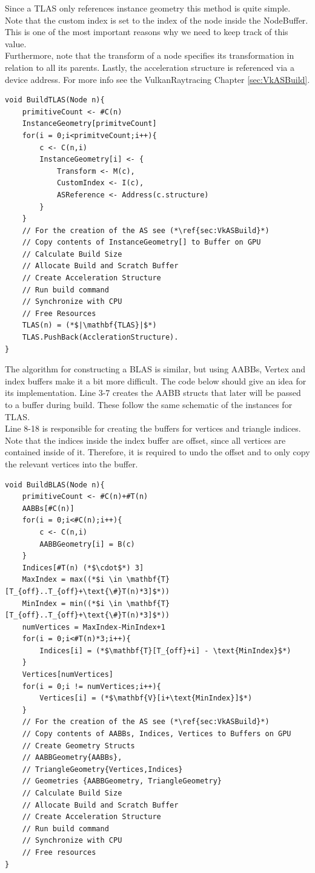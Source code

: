 Since a TLAS only references instance geometry this method is quite simple. Note that the custom index is set to the index of the node inside the NodeBuffer. This is one of the most important reasons why we need to keep track of this value.\\
Furthermore, note that the transform of a node specifies its transformation in relation to all its parents. Lastly, the acceleration structure is referenced via a device address. For more info see the VulkanRaytracing Chapter \ref{sec:VkASBuild}.
\begin{lstlisting}
void BuildTLAS(Node n){
    primitiveCount <- #C(n)
    InstanceGeometry[primitveCount]
    for(i = 0;i<primitveCount;i++){
        c <- C(n,i)
        InstanceGeometry[i] <- {
            Transform <- M(c),
            CustomIndex <- I(c),
            ASReference <- Address(c.structure)
        }
    }
    // For the creation of the AS see (*\ref{sec:VkASBuild}*)
    // Copy contents of InstanceGeometry[] to Buffer on GPU
    // Calculate Build Size
    // Allocate Build and Scratch Buffer
    // Create Acceleration Structure
    // Run build command
    // Synchronize with CPU
    // Free Resources
    TLAS(n) = (*$|\mathbf{TLAS}|$*)
    TLAS.PushBack(AcclerationStructure).
}
\end{lstlisting}
\newpage
The algorithm for constructing a BLAS is similar, but using AABBs, Vertex and index buffers make it a bit more difficult. The code below should give an idea for its implementation. Line 3-7 creates the AABB structs that later will be passed to a buffer during build. These follow the same schematic of the instances for TLAS.\\
Line 8-18 is responsible for creating the buffers for vertices and triangle indices. Note that the indices inside the index buffer are offset, since all vertices are contained inside of it. Therefore, it is required to undo the offset and to only copy the relevant vertices into the buffer.
\begin{lstlisting}
void BuildBLAS(Node n){
    primitiveCount <- #C(n)+#T(n)
    AABBs[#C(n)]
    for(i = 0;i<#C(n);i++){
        c <- C(n,i)
        AABBGeometry[i] = B(c)
    }
    Indices[#T(n) (*$\cdot$*) 3]
    MaxIndex = max((*$i \in \mathbf{T}[T_{off}..T_{off}+\text{\#}T(n)*3]$*))
    MinIndex = min((*$i \in \mathbf{T}[T_{off}..T_{off}+\text{\#}T(n)*3]$*))
    numVertices = MaxIndex-MinIndex+1
    for(i = 0;i<#T(n)*3;i++){
        Indices[i] = (*$\mathbf{T}[T_{off}+i] - \text{MinIndex}$*)
    }
    Vertices[numVertices]
    for(i = 0;i != numVertices;i++){
        Vertices[i] = (*$\mathbf{V}[i+\text{MinIndex}]$*)
    }
    // For the creation of the AS see (*\ref{sec:VkASBuild}*)
    // Copy contents of AABBs, Indices, Vertices to Buffers on GPU
    // Create Geometry Structs 
    // AABBGeometry{AABBs}, 
    // TriangleGeometry{Vertices,Indices}
    // Geometries {AABBGeometry, TriangleGeometry}
    // Calculate Build Size
    // Allocate Build and Scratch Buffer
    // Create Acceleration Structure
    // Run build command
    // Synchronize with CPU
    // Free resources
}
\end{lstlisting}


